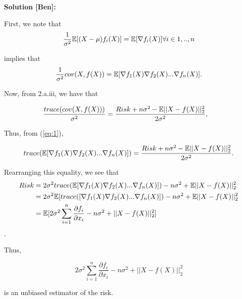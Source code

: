 \documentclass[11pt]{article}
\begin{document}
\begin{enumerate}
\begin{itemize}
\begin{itemize}
  \textbf{Solution [Ben]:}

  First, we note that 
  \[
  \frac{1}{\sigma^2} \mathbb{E}[(X-\mu)f_i(X)] = \mathbb{E}[\nabla f_i(X)] \forall i \in  1,..,n
  \]
  
  implies that 
  \begin{equation}\label{eq:1}
    \frac{1}{\sigma^2}cov(X,f(X))=\mathbb{E}[\nabla f_1(X) \nabla f_2(X) ... \nabla f_n(X) ]. 
  \end{equation}
   
  
  Now, from 2.a.iii, we have that
  
  \begin{align*}
    \frac{trace(cov(X,f(X)))}{\sigma^2}&=\frac{Risk+n\sigma^2-\mathbb{E}||X-f(X)||_2^2}{2\sigma^2},
  \end{align*}
  
  Thus, from (\ref{eq:1}),
  
  \begin{equation*}
    trace(\mathbb{E}[\nabla f_1(X) \nabla f_2(X) ... \nabla f_n(X) ])=\frac{Risk+n\sigma^2-\mathbb{E}||X-f(X)||_2^2}{2\sigma^2}.
  \end{equation*}
  
  
  Rearranging this equality, we see that 
  \begin{align*}
    Risk&=2\sigma^2trace(\mathbb{E}[\nabla f_1(X) \nabla f_2(X) ... \nabla f_n(X)])-n\sigma^2+\mathbb{E}||X-f(X)||_2^2\\
    &=2\sigma^2\mathbb{E}[trace([\nabla f_1(X) \nabla f_2(X) ... \nabla f_n(X)])-n\sigma^2+\mathbb{E}||X-f(X)||_2^2\\
    &=\mathbb{E}[2\sigma^2\sum_{i=1}^n \frac{\partial f_i}{\partial x_i} -n\sigma^2+||X-f(X)||_2^2]
  \end{align*}.
  
  Thus, 
    
  \begin{equation*}
    2\sigma^2\sum_{i=1}^n \frac{\partial f_i}{\partial x_i} -n\sigma^2+||X-f(X)||_2^2
  \end{equation*}
  
  
  is an unbiased estimator of the risk. 
  
\end{itemize}


\end{itemize}
\end{enumerate}
\end{document}
